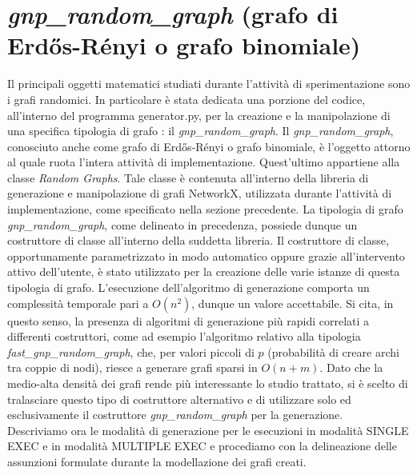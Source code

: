 \section{\textit{gnp\_random\_graph} (grafo di Erdős-Rényi o grafo binomiale)}
\justify
Il principali oggetti matematici studiati durante l'attività di sperimentazione sono i grafi randomici. In particolare è stata dedicata una porzione del codice, all'interno del programma generator.py, per la creazione e la manipolazione di una specifica tipologia di grafo : il \textit{gnp\_random\_graph}. Il \textit{gnp\_random\_graph}, conosciuto anche come grafo di Erdős-Rényi o grafo binomiale, è l'oggetto attorno al quale ruota l'intera attività di implementazione. Quest'ultimo appartiene alla classe \textit{Random Graphs}. Tale classe è contenuta all'interno della libreria di generazione e manipolazione di grafi NetworkX, utilizzata durante l'attività di implementazione, come specificato nella sezione precedente. La tipologia di grafo \textit{gnp\_random\_graph}, come delineato in precedenza, possiede dunque un costruttore di classe all'interno della suddetta libreria. Il costruttore di classe, opportunamente parametrizzato in modo automatico oppure grazie all'intervento attivo dell'utente, è stato utilizzato per la creazione delle varie istanze di questa tipologia di grafo. L'esecuzione dell'algoritmo di generazione comporta un complessità temporale pari a \(O(n^2)\), dunque un valore accettabile. Si cita, in questo senso, la presenza di algoritmi di generazione più rapidi correlati a differenti costruttori, come ad esempio l'algoritmo relativo alla tipologia \textit{fast\_gnp\_random\_graph}, che, per valori piccoli di $p$ (probabilità di creare archi tra coppie di nodi), riesce a generare grafi sparsi in \(O(n+m)\). Dato che la medio-alta densità dei grafi rende più interessante lo studio trattato, si è scelto di tralasciare questo tipo di costruttore alternativo e di utilizzare solo ed esclusivamente il costruttore \textit{gnp\_random\_graph} per la generazione.\\
Descriviamo ora le modalità di generazione per le esecuzioni in modalità SINGLE EXEC e in modalità MULTIPLE EXEC e procediamo con la delineazione delle assunzioni formulate durante la modellazione dei grafi creati.\\

